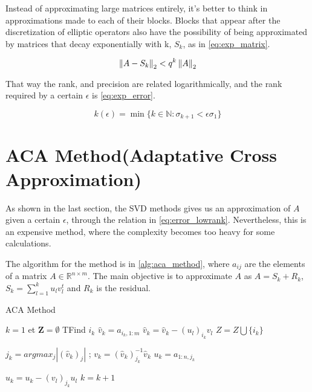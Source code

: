 Instead of approximating large matrices entirely, it's better to think in approximations made to each of their blocks. Blocks that appear after the discretization of elliptic operators also have the possibility of being approximated by matrices that decay exponentially with k, $S_{k}$, as in \ref{eq:exp_matrix}.

\begin{equation}\label{eq:exp_matrix}
    \left\lVert A-S_{k}\right\rVert_{2} < q^{k}\left\lVert A\right\rVert_{2}
\end{equation}


That way the rank, and precision are related logarithmically, and the rank required by a certain $\epsilon$ is \ref{eq:exp_error}.

\begin{equation}\label{eq:exp_error}
    k(\epsilon) = \min\{ k \in \mathbb{N} : \sigma_{k+1} < \epsilon\sigma_{1}\}
\end{equation}

\section{ACA Method(Adaptative Cross Approximation)}

As shown in the last section, the SVD methods gives us an approximation of $A$ given a certain $\epsilon$, through the relation in \ref{eq:error_lowrank}. Nevertheless, this is an expensive method, where the complexity becomes too heavy for some calculations.

The algorithm for the method is in \ref{alg:aca_method}, where $a_{ij}$ are the elements of a matrix $A \in \mathbb{R}^{n\times m}$. The main objective is to approximate $A$ as $A=S_{k} + R_{k}$, $S_{k} = \sum_{l=1}^{k} u_{l}v_{l}^{t}$ and $R_{k}$ is the residual.



\begin{algorithm}
    \caption{ACA Method}\label{alg:aca_method}
    \begin{algorithmic}[1]
        \State $k=1$ et $\mathbf{Z} = \emptyset $
        \Repeat
        \State TFind $i_{k}$
        \State $\hat{v}_{k} = a_{i_{k},1:m} $
        \State $\hat{v}_{k} = \hat{v}_{k} - (u_{l})_{i_{k}}v_{l} $
        \EndFor
        \State $Z = Z \bigcup \{ i_{k} \} $

        \State $j_{k} = argmax_{j}|(\hat{v}_{k})_{j}|$ ; $v_{k} = (\hat{v}_{k})^{-1}_{j_{k}} \hat{v}_{k}$
        \State $u_{k}=a_{1:n,j_{k}}$

        \State $u_{k}=u_{k} - (v_{l})_{j_{k}}u_{l}$
        \EndFor
        \State $k=k+1$

        \EndIf



    \end{algorithmic}
\end{algorithm}

